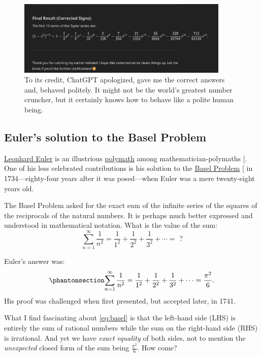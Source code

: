 \documentclass[
  a4paper,
]{article}
\begin{document}
\begin{figure}
\centering
\includegraphics[width=0.9\textwidth,height=\textheight]{images/corrected-results.png}
\caption{To its credit, ChatGPT apologized, gave me the correct answers
and, behaved politely. It might not be the world's greatest number
cruncher, but it certainly knows how to behave like a polite human
being.}\label{fig:corrected-results}
\end{figure}

\subsection{Euler's solution to the Basel
Problem}\label{eulers-solution-to-the-basel-problem}

\href{https://en.wikipedia.org/wiki/Leonhard_Euler}{Leonhard Euler} is
an illustrious
\href{https://www.thefreedictionary.com/polymath}{polymath} among
mathematician-polymaths {[}\citeproc{ref-euler-dunham-1999}{27}{]}. One
of his less celebrated contributions is his solution to the
\href{https://en.wikipedia.org/wiki/Basel_problem}{Basel Problem}
{[}\citeproc{ref-basel-problem}{28}{]} in 1734---eighty-four years after
it was posed---when Euler was a mere twenty-eight years old.

The Basel Problem asked for the exact sum of the infinite series of the
squares of the reciprocals of the natural numbers. It is perhaps much
better expressed and understood in mathematical notation. What is the
value of the sum: \[
\sum_{n=1}^\infty \frac{1}{n^2} = \frac{1}{1^2} + \frac{1}{2^2} + \frac{1}{3^2} + \cdots = \mbox{ ?}
\]

Euler's answer was: \begin{equation}\phantomsection\label{eq:basel}{
\sum_{n=1}^\infty \frac{1}{n^2} = \frac{1}{1^2} + \frac{1}{2^2} + \frac{1}{3^2} + \cdots = \frac{\pi^2}{6}.
}\end{equation} His proof was challenged when first presented, but
accepted later, in 1741.

What I find fascinating about \cref{eq:basel} is that the left-hand side
(LHS) is entirely the sum of rational numbers while the sum on the
right-hand side (RHS) is irrational. And yet we have \emph{exact
equality} of both sides, not to mention the \emph{unexpected} closed
form of the sum being \(\tfrac{\pi^2}{6}\). How come?
\end{document}
